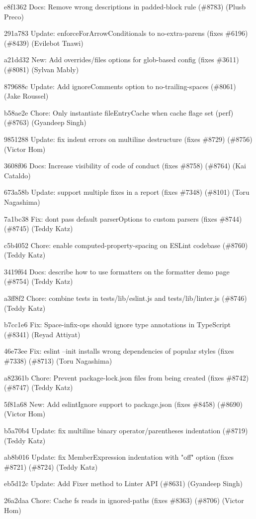 \begin{DoxyItemize}
\item e8f1362 Docs\+: Remove wrong descriptions in {\ttfamily padded-\/block} rule (\#8783) (Plusb Preco)
\item 291a783 Update\+: {\ttfamily enforce\+For\+Arrow\+Conditionals} to {\ttfamily no-\/extra-\/parens} (fixes \#6196) (\#8439) (Evilebot Tnawi)
\item a21dd32 New\+: Add {\ttfamily overrides}/{\ttfamily files} options for glob-\/based config (fixes \#3611) (\#8081) (Sylvan Mably)
\item 879688c Update\+: Add ignore\+Comments option to no-\/trailing-\/spaces (\#8061) (Jake Roussel)
\item b58ae2e Chore\+: Only instantiate file\+Entry\+Cache when cache flage set (perf) (\#8763) (Gyandeep Singh)
\item 9851288 Update\+: fix indent errors on multiline destructure (fixes \#8729) (\#8756) (Victor Hom)
\item 3608f06 Docs\+: Increase visibility of code of conduct (fixes \#8758) (\#8764) (Kai Cataldo)
\item 673a58b Update\+: support multiple fixes in a report (fixes \#7348) (\#8101) (Toru Nagashima)
\item 7a1bc38 Fix\+: don\textquotesingle{}t pass default parser\+Options to custom parsers (fixes \#8744) (\#8745) (Teddy Katz)
\item c5b4052 Chore\+: enable computed-\/property-\/spacing on ESLint codebase (\#8760) (Teddy Katz)
\item 3419f64 Docs\+: describe how to use formatters on the formatter demo page (\#8754) (Teddy Katz)
\item a3ff8f2 Chore\+: combine tests in tests/lib/eslint.\+js and tests/lib/linter.\+js (\#8746) (Teddy Katz)
\item b7cc1e6 Fix\+: Space-\/infix-\/ops should ignore type annotations in Type\+Script (\#8341) (Reyad Attiyat)
\item 46e73ee Fix\+: eslint --init installs wrong dependencies of popular styles (fixes \#7338) (\#8713) (Toru Nagashima)
\item a82361b Chore\+: Prevent package-\/lock.\+json files from being created (fixes \#8742) (\#8747) (Teddy Katz)
\item 5f81a68 New\+: Add eslint\+Ignore support to package.\+json (fixes \#8458) (\#8690) (Victor Hom)
\item b5a70b4 Update\+: fix multiline binary operator/parentheses indentation (\#8719) (Teddy Katz)
\item ab8b016 Update\+: fix Member\+Expression indentation with "{}off"{} option (fixes \#8721) (\#8724) (Teddy Katz)
\item eb5d12c Update\+: Add Fixer method to Linter API (\#8631) (Gyandeep Singh)
\item 26a2daa Chore\+: Cache fs reads in ignored-\/paths (fixes \#8363) (\#8706) (Victor Hom)
\end{DoxyItemize}


